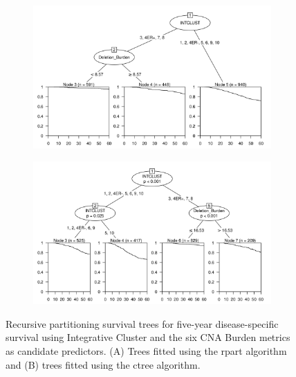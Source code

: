 \begin{figure}[!h]
\centering

\vspace{0.5cm}

\begin{subfigure}{\textwidth}
\subcaption{}
\includegraphics[width=1\textwidth]{../figures/Chapter_3/PartyKit_Survival_Burden_FiveYearDSS_INTCLUST.png}
\end{subfigure}

\vspace{2cm}

\begin{subfigure}{\textwidth}
\subcaption{}
\includegraphics[width=1\textwidth]{../figures/Chapter_3/Ctree_Survival_Burden_FiveYearDSS_INTCLUST.png}
\end{subfigure}

\vspace{0.5cm}

\caption[Recursive partitioning survival trees for five-year disease-specific survival using Integrative Cluster and the six CNA Burden metrics as candidate predictors.]{Recursive partitioning survival trees for five-year disease-specific survival using Integrative Cluster and the six CNA Burden metrics as candidate predictors. (A) Trees fitted using the rpart algorithm and (B) trees fitted using the ctree algorithm.}
\label{fig:INTCLUST_CNA_Burden_FiveYearDSS}
\end{figure}

